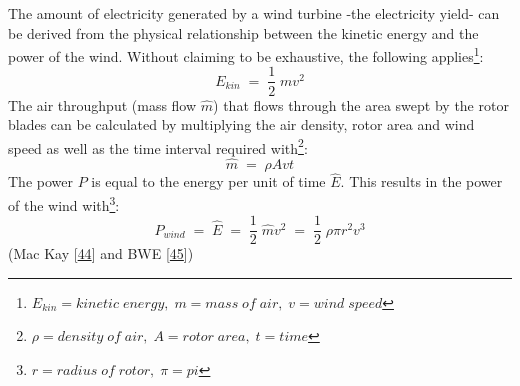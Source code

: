 \documentclass[a4paper,11pt]{article}
\begin{document}
The amount of electricity generated by a wind turbine -the electricity yield- can be derived from the physical relationship between the kinetic energy and the power of the wind. Without claiming to be exhaustive, the following applies\footnote{\(E_{kin}= kinetic\; energy,\; m=mass\; of\; air,\; v= wind\;speed\)}:
\begin{equation}
E_{kin}\; =\; \frac{1}{2}\;mv^2
\end{equation}
The air throughput (mass flow \(\hat{m}\)) that flows through the area swept by the rotor blades can be calculated by multiplying the air density, rotor area and wind speed as well as the time interval required with\footnote{\(\rho= density\; of\; air,\; A= rotor\; area,\; t=time\)}:
\begin{equation}
\hat{m}\;=\;\rho A vt
\end{equation}
The power \(P\) is equal to the energy per unit of time \(\hat{E}\). This results in the power of the wind with\footnote{\(r= radius\; of\; rotor, \; \pi=pi\)}:
\begin{equation}
P_{wind}\;=\;\hat{E}\;=\;\frac{1}{2}\;\hat{m}v^2\;=\;\frac{1}{2}\; \rho \pi r^2 v^3
\end{equation}
(Mac Kay {[}\protect\hyperlink{ref-DavidJCMacKay.2009}{44}{]} and BWE {[}\protect\hyperlink{ref-BWE.2021}{45}{]})
\end{document}
